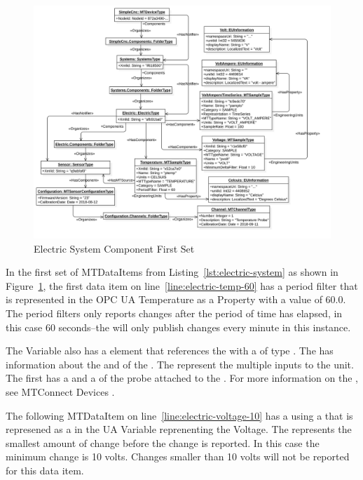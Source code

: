 \begin{figure}[ht]
  \centering
  \includegraphics[width=1.0\textwidth]{diagrams/mtconnect-mapping/electric-system.png}
  \caption{Electric System Component First Set}
  \label{fig:electric-system}
\end{figure}

In the first set of \glspl{MTDataItem} from Listing~\ref{lst:electric-system} as shown in Figure~\ref{fig:electric-system}, the first data item on line~\ref{line:electric-temp-60} has a period filter that is represented in the OPC UA  Temperature as a  \gls{Property} with a value of 60.0. The period filters only reports changes after the period of time has elapsed, in this case 60 seconds--the  will only publish changes every minute in this instance.

The  \gls{Variable} also has a  element that references the  with a  of type . The  has information about the  and  of the . The  represent the multiple inputs to the  unit. The first  has a  and a  of the probe attached to the . For more information on the , see MTConnect Devices \cite{MTCPart2}.

The following \gls{MTDataItem} on line~\ref{line:electric-voltage-10} has a  using a  that is represened as a  in the UA \gls{Variable} reprenenting the  Voltage. The  represents the smallest amount of change before the change is reported. In this case the minimum change is 10 volts. Changes smaller than 10 volts will not be reported for this data item.

